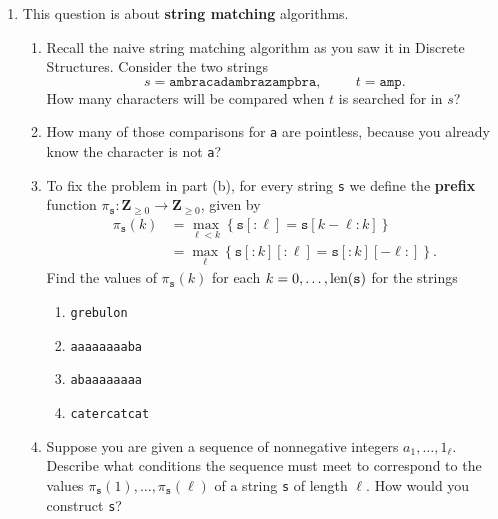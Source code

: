 \documentclass[a4paper,12pt]{article}
\newcommand\Z{\mathbf{Z}}
\begin{document}
\begin{enumerate}
\vfill
\item This question is about \textbf{string matching} algorithms.
\begin{enumerate}
\item Recall the naive string matching algorithm as you saw it in Discrete Structures. Consider the two strings
\[
s = \texttt{ambracadambrazampbra},
\hspace{1cm}
t = \texttt{amp}.
\]
How many characters will be compared when $t$ is searched for in $s$?
\item How many of those comparisons for \texttt{a} are pointless, because you already know the character is not \texttt{a}?
\item To fix the problem in part (b), for every string \texttt{s} we define the \textbf{prefix} function $\pi_{\texttt{s}}\colon \Z_{\geqslant 0} \to \Z_{\geqslant 0}$, given by
\begin{align*}
\pi_{\texttt{s}}(k) & = \max_{\ell<k} \left\{\texttt{s}[:\ell] = \texttt{s}[k-\ell:k]\right\} \\
& = \max_\ell \left\{\texttt{s}[:k][:\ell] = \texttt{s}[:k][-\ell:]\right\}.
\end{align*}
Find the values of $\pi_{\texttt{s}}(k)$ for each $k=0,\dots,\textup{len}(\texttt{s})$ for the strings
\begin{multicols}{4}
\begin{enumerate}
\item \texttt{grebulon}
\item \texttt{aaaaaaaaba}
\item \texttt{abaaaaaaaa}
\item \texttt{catercatcat}
\end{enumerate}
\end{multicols}
\item Suppose you are given a sequence of nonnegative integers $a_1,\dots,1_\ell$. Describe what conditions the sequence must meet to correspond to the values $\pi_{\texttt{s}}(1),\dots,\pi_{\texttt{s}}(\ell)$ of a string \texttt{s} of length $\ell$. How would you construct \texttt{s}?
\end{enumerate}
\end{enumerate}

\vfill
\vfill
\end{document}
